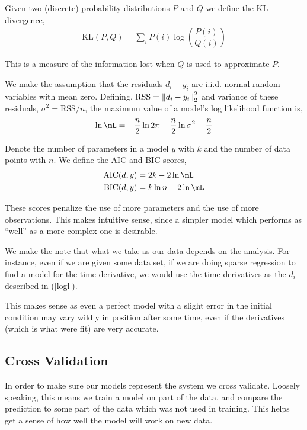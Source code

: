 \documentclass[10pt]{article}
\begin{document}
Given two (discrete) probability distributions \( P \) and \( Q \) we define the KL divergence,
\begin{align}
    \text{KL}(P,Q) = \sum_i P(i) \log \left( \dfrac{P(i)}{Q(i)} \right) \label{kl}
\end{align}

This is a measure of the information lost when \( Q \) is used to approximate \( P \).


We make the assumption that the residuals \( d_i - y_i \) are i.i.d. normal random variables with mean zero. Defining, \( \text{RSS} = \left\lVert d_i - y_i\right\rVert_2^2 \) and variance of these residuals, \( \sigma^2 = \text{RSS} / n \), the maximum value of a model's log likelihood function is,
\begin{align}
    \ln\mL = -\dfrac{n}{2} \ln 2\pi - \dfrac{n}{2}\ln \sigma^2 - \dfrac{n}{2} \label{logl}
\end{align}

Denote the number of parameters in a model \( y \) with \( k \) and the number of data points with \( n \). We define the AIC and BIC scores,
\begin{align}
    \text{AIC}(d,y) &= 2k - 2\ln\mL \label{aic} \\
    \text{BIC}(d,y) &= k \ln n - 2\ln\mL \label{bic}
\end{align}

These scores penalize the use of more parameters and the use of more observations. This makes intuitive sense, since a simpler model which performs as ``well'' as a more complex one is desirable.

We make the note that what we take as our data depends on the analysis. For instance, even if we are given some data set, if we are doing sparse regression to find a model for the time derivative, we would use the time derivatives as the \( d_i \) described in (\ref{logl}).

This makes sense as even a perfect model with a slight error in the initial condition may vary wildly in position after some time, even if the derivatives (which is what were fit) are very accurate.

\subsection{Cross Validation}
In order to make sure our models represent the system we cross validate. Loosely speaking, this means we train a model on part of the data, and compare the prediction to some part of the data which was not used in training. This helps get a sense of how well the model will work on new data.
\end{document}
